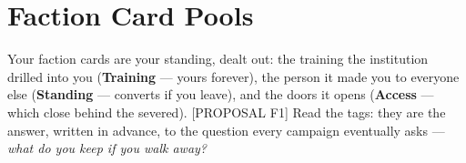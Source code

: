 %
%

\chapter{Faction Card Pools}

Your faction cards are your standing, dealt out: the training the institution drilled into you (\textbf{Training} --- yours forever), the person it made you to everyone else (\textbf{Standing} --- converts if you leave), and the doors it opens (\textbf{Access} --- which close behind the severed). [PROPOSAL F1] Read the tags: they are the answer, written in advance, to the question every campaign eventually asks --- \textit{what do you keep if you walk away?}

